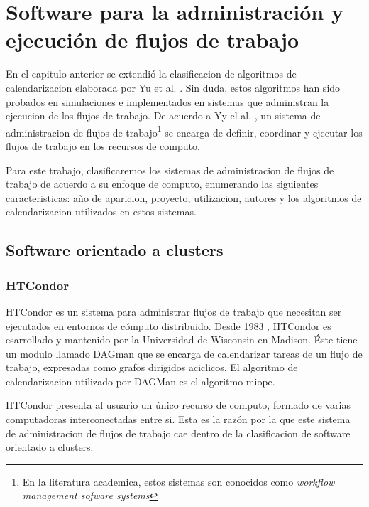 \chapter{Software para la administración y ejecución de flujos de trabajo}

En el capitulo anterior  se extendió la clasificacion de algoritmos de calendarizacion elaborada por Yu et al. \cite{yu2008workflow}. Sin duda, estos algoritmos han sido probados en simulaciones e implementados en sistemas que administran la  ejecucion de los flujos de trabajo. De acuerdo a Yy el al. \cite{yu2008workflow}, un sistema de administracion de flujos de trabajo\footnote{En la literatura academica, estos sistemas son conocidos como \emph{workflow management sofware systems}} se encarga de definir, coordinar y ejecutar los flujos de trabajo en los recursos de computo.

Para este trabajo, clasificaremos los sistemas de administracion de flujos de trabajo de acuerdo a su enfoque de computo, enumerando las siguientes caracteristicas: año de aparicion, proyecto, utilizacion, autores y los algoritmos de calendarizacion utilizados en estos sistemas.

\section{Software orientado a clusters}


\subsection{HTCondor}

HTCondor \cite{condor-practice} es un sistema para administrar flujos de trabajo que necesitan ser ejecutados en entornos de cómputo distribuido. Desde 1983 \cite{htcondor2014webpage}, HTCondor es esarrollado y mantenido por la Universidad de Wisconsin en Madison. Éste tiene un modulo llamado DAGman que se encarga de calendarizar tareas de un flujo de trabajo, expresadas como grafos dirigidos aciclicos. El algoritmo de calendarizacion utilizado por DAGMan es el algoritmo miope. 

HTCondor presenta al usuario un único recurso de computo, formado de varias computadoras interconectadas entre si. Esta es la razón por la que este sistema de administracion de flujos de trabajo cae dentro de la clasificacion de software orientado a clusters.

